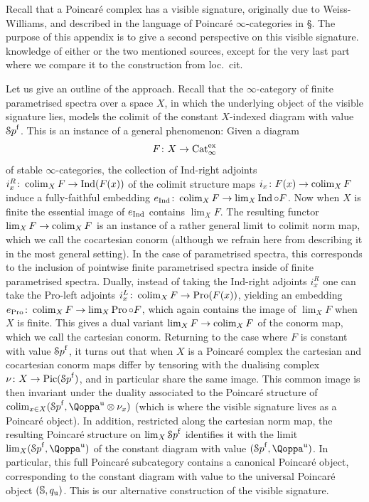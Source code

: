 




Recall that a Poincaré complex has a visible signature, originally due to Weiss-Williams, and described in the language of Poincaré $\infty$-categories in \S{}. The purpose of this appendix is to give a second perspective on this visible signature. 
knowledge of either or the two mentioned sources, except for the very last part where we compare it to the construction from loc.\ cit.

Let us give an outline of the approach. Recall that the $\infty$-category of finite parametrised spectra over a space $X$, in which the underlying object of the visible signature lies, models the colimit of the constant $X$-indexed diagram with value ${\mathcal Sp}^{\mathrm{f}}$. This is an instance of a general phenomenon: Given a diagram 
\[
F\colon X \to \mathrm{Cat}_\infty^{\mathrm{ex}}
\]
of stable $\infty$-categories, the collection of Ind-right adjoints $i_x^R\colon \mathop{\mathrm{colim}}_X F \to \operatorname{Ind}(F(x))$ of the colimit structure maps $i_x\colon F(x) \to \mathop{\mathrm{colim}}_X F$ induce a fully-faithful embedding $e_{\operatorname{Ind}}\colon \mathop{\mathrm{colim}}_X F \to \lim_X \operatorname{Ind}\circ F$. Now when $X$ is finite the essential image of $e_{\operatorname{Ind}}$ contains $\lim_X F$. 
The resulting functor $\lim_X F \to \mathop{\mathrm{colim}}_X F$ is an instance of a rather general limit to colimit norm map, which we call the cocartesian conorm (although we refrain here from describing it in the most general setting). In the case of parametrised spectra, this corresponds to the inclusion of pointwise finite parametrised spectra inside of finite parametrised spectra. Dually, instead of taking the Ind-right adjoints $i_x^R$ one can take the Pro-left adjoints $i_x^L\colon \mathop{\mathrm{colim}}_X F \to \operatorname{Pro}(F(x))$, yielding an embedding $e_{\operatorname{Pro}}\colon \mathop{\mathrm{colim}}_X F \to \lim_X \operatorname{Pro}\circ F$, which again contains the image of $\lim_X F$ when $X$ is finite. This gives a dual variant $\lim_X F \to \mathop{\mathrm{colim}}_X F$ of the conorm map, which we call the cartesian conorm. Returning to the case where $F$ is constant with value ${\mathcal Sp}^{\mathrm{f}}$, it turns out that when $X$ is a Poincaré complex the cartesian and cocartesian conorm maps differ by tensoring with the dualising complex $\nu\colon X \to \operatorname{Pic}({\mathcal Sp}^{\mathrm{f}})$, and in particular share the same image. This common image is then invariant 
under the duality associated to the Poincaré structure of $\colim_{x \in X} (\Spaf,\QF^{\uni}\otimes \nu_x)$ (which is where the visible signature lives as a Poincaré object). In addition, restricted along the cartesian norm map, the resulting Poincaré structure on $\lim_X {\mathcal Sp}^{\mathrm{f}}$ identifies it with the limit $\lim_X (\Spaf,\QF^{\uni})$ of the constant diagram with value $(\Spaf,\QF^{\uni})$. In particular, this full Poincaré subcategory contains a canonical Poincaré object, corresponding to the constant diagram with value to the universal Poincaré object $(\mathbb{S},q_{\mathrm{u}})$. This is our alternative construction of the visible signature.  




